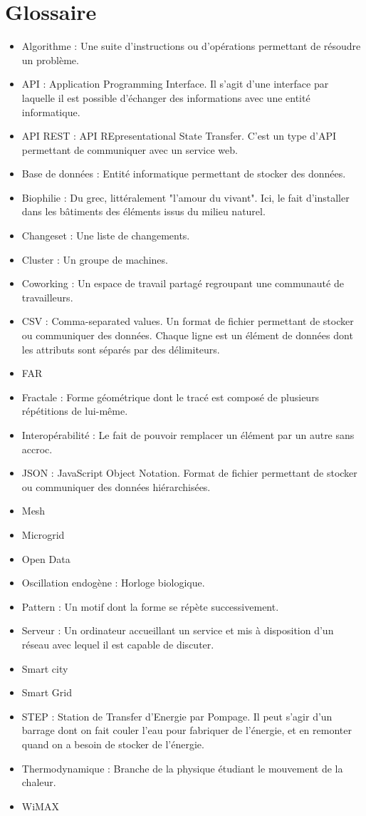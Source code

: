 \chapter*{Glossaire}

\begin{itemize}
    \item Algorithme : Une suite d'instructions ou d'opérations permettant de résoudre un problème.
    \item API : Application Programming Interface. Il s'agit d'une interface par laquelle
il est possible d'échanger des informations avec une entité informatique.
    \item API REST : API REpresentational State Transfer.
C'est un type d'API permettant de communiquer avec un service web.
    \item Base de données : Entité informatique permettant de stocker des données.
    \item Biophilie : Du grec, littéralement "l'amour du vivant".
Ici, le fait d'installer dans les bâtiments des éléments issus du milieu naturel.
    \item Changeset : Une liste de changements.
    \item Cluster : Un groupe de machines.
    \item Coworking : Un espace de travail partagé regroupant une communauté de travailleurs.
    \item CSV : Comma-separated values. Un format de fichier permettant de stocker ou communiquer des données.
Chaque ligne est un élément de données dont les attributs sont séparés par des délimiteurs.
    \item FAR
    \item Fractale : Forme géométrique dont le tracé est composé de plusieurs répétitions de lui-même.
    \item Interopérabilité : Le fait de pouvoir remplacer un élément par un autre sans accroc.
    \item JSON : JavaScript Object Notation. Format de fichier permettant de stocker ou communiquer des données hiérarchisées.
    \item Mesh
    \item Microgrid
    \item Open Data
    \item Oscillation endogène : Horloge biologique.
    \item Pattern : Un motif dont la forme se répète successivement.
    \item Serveur : Un ordinateur accueillant un service et mis à disposition d'un réseau avec lequel il est capable de discuter.
    \item Smart city
    \item Smart Grid
    \item STEP : Station de Transfer d'Energie par Pompage.
Il peut s'agir d'un barrage dont on fait couler l'eau pour fabriquer de l'énergie, et en remonter quand on a besoin de stocker de l'énergie.
    \item Thermodynamique : Branche de la physique étudiant le mouvement de la chaleur.
    \item WiMAX
\end{itemize}


